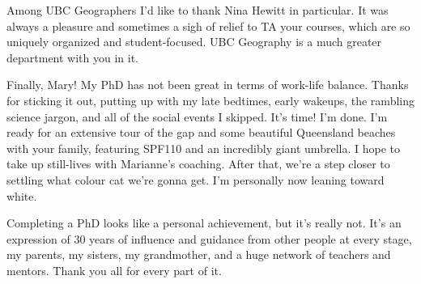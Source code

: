 Among UBC Geographers I'd like to thank Nina Hewitt in particular. It was always a pleasure and sometimes a sigh of relief to TA your courses, which are so uniquely organized and student-focused. UBC Geography is a much greater department with you in it.

Finally, Mary! My PhD has not been great in terms of work-life balance. Thanks for sticking it out, putting up with my late bedtimes, early wakeups, the rambling science jargon, and all of the social events I skipped. It's time! I'm done. I'm ready for an extensive tour of the gap and some beautiful Queensland beaches with your family, featuring SPF110 and an incredibly giant umbrella. I hope to take up still-lives with Marianne's coaching. After that, we're a step closer to settling what colour cat we're gonna get. I'm personally now leaning toward white.

Completing a PhD looks like a personal achievement, but it's really not.
It's an expression of 30 years of influence and guidance from other people at every stage, my parents, my sisters, my grandmother, and a huge network of teachers and mentors. Thank you all for every part of it.


